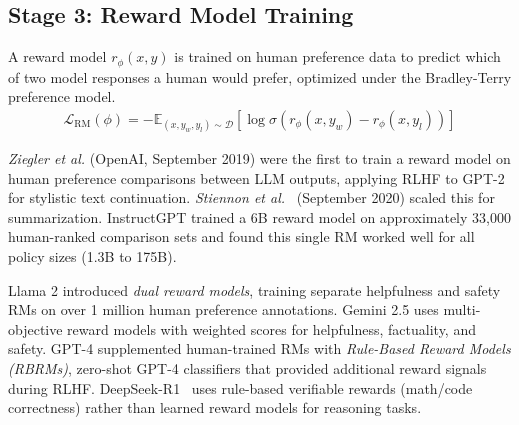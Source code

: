 \documentclass[12pt]{article}
\begin{document}
\subsection{Stage 3: Reward Model Training}

A reward model $r_\phi(x, y)$ is trained on human preference data to predict which of two model responses a human would prefer, optimized under the Bradley-Terry preference model.
\begin{align}
\mathcal{L}_{\text{RM}}(\phi) = -\mathbb{E}_{(x, y_w, y_l) \sim \mathcal{D}} \left[ \log \sigma\!\left( r_\phi(x, y_w) - r_\phi(x, y_l) \right) \right]
\end{align}

\textit{Ziegler et al.} (OpenAI, September 2019) were the first to train a reward model on human preference comparisons between LLM outputs, applying RLHF to GPT-2 for stylistic text continuation. \textit{Stiennon et al.}~\cite{Stiennon2020Summarize} (September 2020) scaled this for summarization. InstructGPT trained a 6B reward model on approximately 33,000 human-ranked comparison sets and found this single RM worked well for all policy sizes (1.3B to 175B).

Llama 2 introduced \textit{dual reward models}, training separate helpfulness and safety RMs on over 1 million human preference annotations. Gemini 2.5 uses multi-objective reward models with weighted scores for helpfulness, factuality, and safety. GPT-4 supplemented human-trained RMs with \textit{Rule-Based Reward Models (RBRMs)}, zero-shot GPT-4 classifiers that provided additional reward signals during RLHF. DeepSeek-R1~\cite{Guo2025DeepSeekR1} uses rule-based verifiable rewards (math/code correctness) rather than learned reward models for reasoning tasks.
\end{document}
